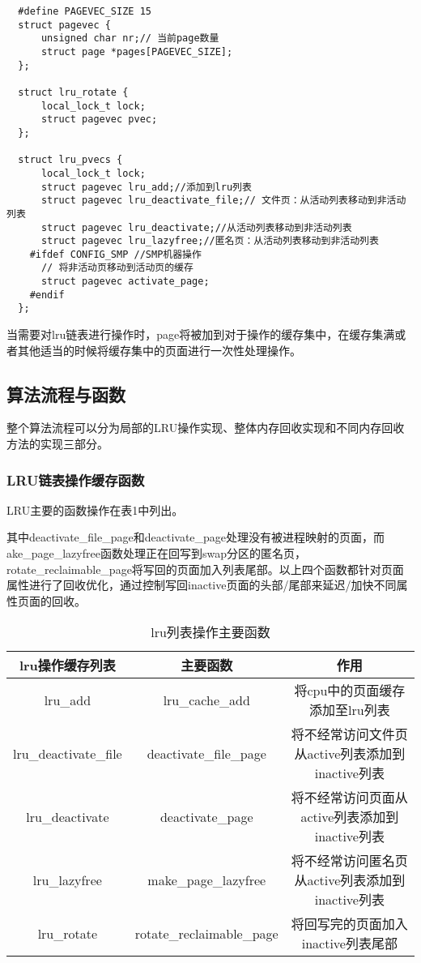 \documentclass[11pt, a4paper, oneside,UTF8]{ctexart}
\begin{document}
\begin{lstlisting}
  #define PAGEVEC_SIZE 15
  struct pagevec {
      unsigned char nr;// 当前page数量
      struct page *pages[PAGEVEC_SIZE];
  };

  struct lru_rotate {
      local_lock_t lock;
      struct pagevec pvec;
  };

  struct lru_pvecs {
      local_lock_t lock;
      struct pagevec lru_add;//添加到lru列表
      struct pagevec lru_deactivate_file;// 文件页：从活动列表移动到非活动列表
      struct pagevec lru_deactivate;//从活动列表移动到非活动列表
      struct pagevec lru_lazyfree;//匿名页：从活动列表移动到非活动列表
    #ifdef CONFIG_SMP //SMP机器操作
      // 将非活动页移动到活动页的缓存
      struct pagevec activate_page;
    #endif
  };

\end{lstlisting}

当需要对lru链表进行操作时，page将被加到对于操作的缓存集中，在缓存集满或者其他适当的时候将缓存集中的页面进行一次性处理操作。

\subsection{算法流程与函数}

整个算法流程可以分为局部的LRU操作实现、整体内存回收实现和不同内存回收方法的实现三部分。

\subsubsection{LRU链表操作缓存函数}

LRU主要的函数操作在表1中列出。

其中deactivate\_file\_page和deactivate\_page处理没有被进程映射的页面，而ake\_page\_lazyfree函数处理正在回写到swap分区的匿名页，rotate\_reclaimable\_page将写回的页面加入列表尾部。以上四个函数都针对页面属性进行了回收优化，通过控制写回inactive页面的头部/尾部来延迟/加快不同属性页面的回收。


\begin{table}[h]
  \centering
  \begin{tabular}{|c|c|c|}
      \toprule
      lru操作缓存列表& 主要函数 & 作用 \\
      \midrule
      lru\_add&lru\_cache\_add & 将cpu中的页面缓存添加至lru列表\\ 
      lru\_deactivate\_file& deactivate\_file\_page& 将不经常访问文件页从active列表添加到inactive列表 \\
      lru\_deactivate & deactivate\_page &将不经常访问页面从active列表添加到inactive列表\\
      lru\_lazyfree & make\_page\_lazyfree &将不经常访问匿名页从active列表添加到inactive列表\\
      lru\_rotate & rotate\_reclaimable\_page &将回写完的页面加入inactive列表尾部\\
      \bottomrule
  \end{tabular}
  \caption{lru列表操作主要函数}
  \label{tab:1.1}
\end{table}
\end{document}
